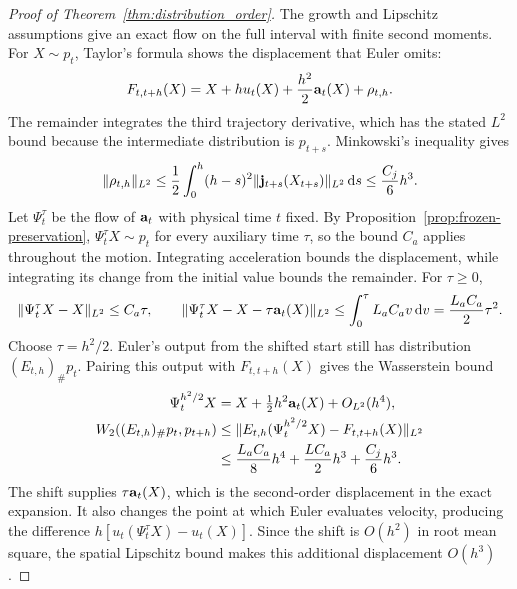 \begin{proof}[Proof of Theorem~\ref{thm:distribution_order}]
\label{proof:distribution-order}
The growth and Lipschitz assumptions give an exact flow on the full interval with finite second moments. For $X\sim p_t$, Taylor's formula shows the displacement that Euler omits:
\[
 F_{t,t+h}(X)=X+hu_t(X)+\frac{h^2}{2}\mathbf a_t(X)+\rho_{t,h}.
\]
The remainder integrates the third trajectory derivative, which has the stated $L^2$ bound because the intermediate distribution is $p_{t+s}$. Minkowski's inequality gives
\begin{equation}
 \|\rho_{t,h}\|_{L^2}
 \le\frac12\int_0^h(h-s)^2
       \|\mathbf j_{t+s}(X_{t+s})\|_{L^2}\,\mathrm d s
 \le\frac{C_j}{6}h^3.
 \label{eq:flow-remainder-l2}
\end{equation}
Let $\Psi_t^\tau$ be the flow of $\mathbf a_t$ with physical time $t$ fixed. By Proposition~\ref{prop:frozen-preservation}, $\Psi_t^\tau X\sim p_t$ for every auxiliary time $\tau$, so the bound $C_a$ applies throughout the motion. Integrating acceleration bounds the displacement, while integrating its change from the initial value bounds the remainder. For $\tau\ge0$,
\[
 \|\Psi_t^\tau X-X\|_{L^2}\le C_a\tau,
 \qquad
 \|\Psi_t^\tau X-X-\tau\mathbf a_t(X)\|_{L^2}
 \le\int_0^\tau L_aC_av\,\mathrm d v=\frac{L_aC_a}{2}\tau^2.
\]
Choose $\tau=h^2/2$. Euler's output from the shifted start still has distribution $(E_{t,h})_\#p_t$. Pairing this output with $F_{t,t+h}(X)$ gives the Wasserstein bound
\begin{align}
 \Psi_t^{h^2/2}X&=X+\tfrac12h^2\mathbf a_t(X)+O_{L^2}(h^4),\nonumber\\
 W_2((E_{t,h})_\#p_t,p_{t+h})
 &\le\|E_{t,h}(\Psi_t^{h^2/2}X)-F_{t,t+h}(X)\|_{L^2}\nonumber\\
 &\le\frac{L_aC_a}{8}h^4+\frac{LC_a}{2}h^3+\frac{C_j}{6}h^3.
 \label{eq:coupling-bound}
\end{align}
The shift supplies $\tau\mathbf a_t(X)$, which is the second-order displacement in the exact expansion. It also changes the point at which Euler evaluates velocity, producing the difference $h[u_t(\Psi_t^\tau X)-u_t(X)]$. Since the shift is $O(h^2)$ in root mean square, the spatial Lipschitz bound makes this additional displacement $O(h^3)$.


\end{proof}
